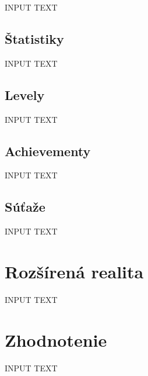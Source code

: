 \documentclass[10pt,slovak,a4paper]{article}
\begin{document}
INPUT TEXT

\subsection{Štatistiky} \label{statistics}

INPUT TEXT

\subsection{Levely} \label{levels}

INPUT TEXT

\subsection{Achievementy} \label{achievements}

INPUT TEXT

\subsection{Súťaže} \label{competitions}

INPUT TEXT

\section{Rozšírená realita} \label{Augmented_reality}

INPUT TEXT

\section{Zhodnotenie} \label{Evaluation}

INPUT TEXT

%
%
\end{document}
